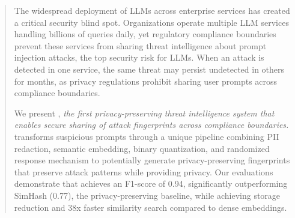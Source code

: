 
\begin{abstract}
    The widespread deployment of LLMs across enterprise services has created a critical security blind spot. Organizations operate multiple LLM services handling billions of queries daily, yet regulatory compliance boundaries prevent these services from sharing threat intelligence about prompt injection attacks, the top security risk for LLMs. When an attack is detected in one service, the same threat may persist undetected in others for months, as privacy regulations prohibit sharing user prompts across compliance boundaries.

    We present \tool, \emph{the first privacy-preserving threat intelligence system that enables secure sharing of attack fingerprints across compliance boundaries.}
    \tool transforms suspicious prompts through a unique pipeline combining PII redaction, semantic embedding, binary quantization, and randomized response mechanism to potentially generate privacy-preserving fingerprints that preserve attack patterns while providing privacy.
    Our evaluations demonstrate that \tool
    achieves an F1-score of 0.94, significantly outperforming SimHash (0.77), the privacy-preserving baseline, while achieving storage reduction and 38x faster similarity search compared to dense embeddings.

\end{abstract}

